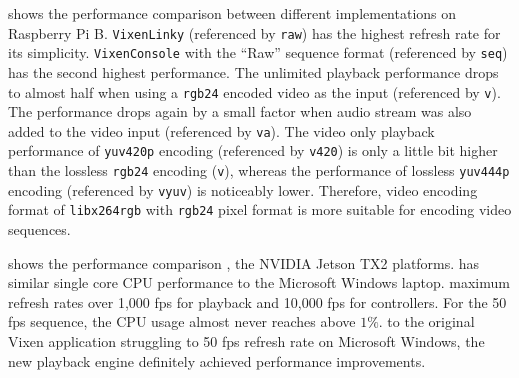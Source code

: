  shows the performance comparison between different implementations on Raspberry Pi B. \texttt{VixenLinky} (referenced by \texttt{raw}) has the highest refresh rate for its simplicity. \texttt{VixenConsole} with the ``Raw'' sequence format (referenced by \texttt{seq}) has the second highest performance. The unlimited playback performance drops to almost half when using a \texttt{rgb24} encoded video as the input (referenced by \texttt{v}). The performance drops again by a small factor when audio stream was also added to the video input (referenced by \texttt{va}). The video only playback performance of \texttt{yuv420p} encoding (referenced by \texttt{v420}) is only a little bit higher than the lossless \texttt{rgb24} encoding (\texttt{v}), whereas the performance of lossless \texttt{yuv444p} encoding (referenced by \texttt{vyuv}) is noticeably lower. Therefore, video encoding format of \texttt{libx264rgb} with \texttt{rgb24} pixel format is more suitable for encoding video sequences.

  shows the performance comparison ,  the NVIDIA Jetson TX2 platforms.  has  similar single core CPU performance to the Microsoft Windows laptop.  maximum refresh rates  over 1,000 fps for playback and 10,000 fps for controllers. For the 50 fps  sequence, the CPU usage almost never reaches above $1 \%$.  to the original Vixen application struggling to  50 fps refresh rate on Microsoft Windows, the new playback engine definitely achieved  performance improvements.

